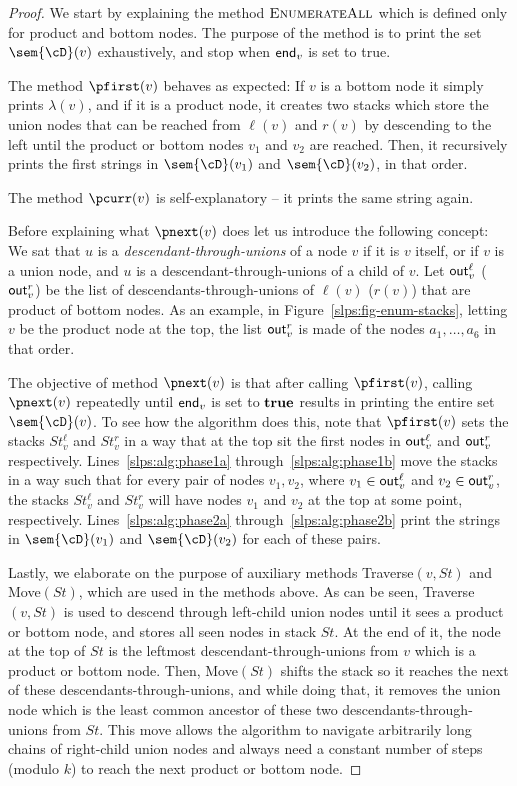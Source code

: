 \begin{proof}
We start by explaining the method $\text{\sc EnumerateAll}$ which is defined only for product and bottom nodes. The purpose of the method is to print the set $\sem{\cD}(v)$ exhaustively, and stop when $\text{\sf end}_v$ is set to true.

The method $\pfirst(v)$ behaves as expected: If $v$ is a bottom node it simply prints $\lambda(v)$, and if it is a product node, it creates two stacks which store the union nodes that can be reached from $\ell(v)$ and $r(v)$ by descending to the left until the product or bottom nodes $v_1$ and $v_2$ are reached. Then, it recursively prints the first strings in $\sem{\cD}(v_1)$ and $\sem{\cD}(v_2)$, in that order.

The method $\pcurr(v)$ is self-explanatory -- it prints the same string again.

Before explaining what $\pnext(v)$ does let us introduce the following concept: We sat that $u$ is a {\it descendant-through-unions} of a node $v$ if it is $v$ itself, or if $v$ is a union node, and $u$ is a descendant-through-unions of a child of $v$. Let $\text{\sf out}^{\ell}_v$ ($\text{\sf out}^{r}_v$) be the list of descendants-through-unions of $\ell(v)$ ($r(v)$) that are product of bottom nodes. As an example, in Figure~\ref{slps:fig-enum-stacks}, letting $v$ be the product node at the top, the list $\text{\sf out}^{r}_v$  is made of the nodes  $a_1,\ldots, a_6$ in that order.

The objective of method $\pnext(v)$ is that after calling $\pfirst(v)$, calling $\pnext(v)$ repeatedly until $\text{\sf end}_v$ is set to $\text{\bf true}$ results in printing the entire set $\sem{\cD}(v)$. To see how the algorithm does this, note that $\pfirst(v)$ sets the stacks $St^{\ell}_v$ and $St^{r}_v$ in a way that at the top sit the first nodes in $\text{\sf out}^{\ell}_v$ and $\text{\sf out}^{r}_v$ respectively. Lines~\ref{slps:alg:phase1a} through~\ref{slps:alg:phase1b} move the stacks in a way such that for every pair of nodes $v_1, v_2$, where $v_1\in\text{\sf out}^{\ell}_v$ and $v_2\in\text{\sf out}^{r}_v$, the stacks $St^{\ell}_v$ and $St^{r}_v$ will have nodes $v_1$ and $v_2$ at the top at some point, respectively. Lines~\ref{slps:alg:phase2a} through~\ref{slps:alg:phase2b} print the strings in $\sem{\cD}(v_1)$ and $\sem{\cD}(v_2)$ for each of these pairs.

Lastly, we elaborate on the purpose of auxiliary methods {\sc Traverse}$(v, St)$ and {\sc Move}$(St)$, which are used in the methods above. As can be seen,  {\sc Traverse}$(v, St)$ is used to descend through left-child union nodes until it sees a product or bottom node, and stores all seen nodes in stack $St$. At the end of it, the node at the top of $St$ is the leftmost descendant-through-unions from $v$ which is a product or bottom node. Then, {\sc Move}$(St)$ shifts the stack so it reaches the next of these descendants-through-unions, and while doing that, it removes the union node which is the least common ancestor of these two descendants-through-unions from $St$. This move allows the algorithm to navigate arbitrarily long chains of right-child union nodes and always need a constant number of steps (modulo $k$) to reach the next product or bottom node.


\end{proof}
